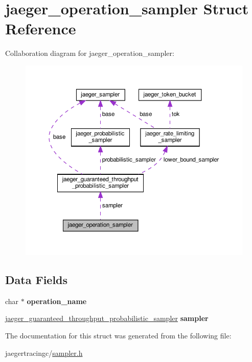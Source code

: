 \hypertarget{structjaeger__operation__sampler}{}\section{jaeger\+\_\+operation\+\_\+sampler Struct Reference}
\label{structjaeger__operation__sampler}


Collaboration diagram for jaeger\+\_\+operation\+\_\+sampler\+:\nopagebreak
\begin{figure}[H]
\begin{center}
\leavevmode
\includegraphics[width=350pt]{structjaeger__operation__sampler__coll__graph}
\end{center}
\end{figure}
\subsection*{Data Fields}
\begin{DoxyCompactItemize}
\item 
\mbox{\label{structjaeger__operation__sampler_a4b5bd75a1b00242355c7d9094294fe5c}} 
char $\ast$ {\bfseries operation\+\_\+name}
\item 
\mbox{\label{structjaeger__operation__sampler_a3996d2cdbbb5f6047a1e130e2ca397b5}} 
\mbox{\hyperlink{structjaeger__guaranteed__throughput__probabilistic__sampler}{jaeger\+\_\+guaranteed\+\_\+throughput\+\_\+probabilistic\+\_\+sampler}} {\bfseries sampler}
\end{DoxyCompactItemize}


The documentation for this struct was generated from the following file\+:\begin{DoxyCompactItemize}
\item 
jaegertracingc/\mbox{\hyperlink{sampler_8h}{sampler.\+h}}\end{DoxyCompactItemize}

